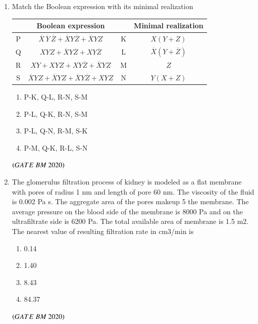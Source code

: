\documentclass[journal,12pt,onecolumn]{IEEEtran}
\theoremstyle{remark}
\begin{document}
\begin{enumerate}
\item Match the Boolean expression with its minimal realization\\
\begin{center}
\begin{tabular}{|c|c|c|c|}
\hline
\textbf{} & \textbf{Boolean expression} & \textbf{} & \textbf{Minimal realization} \\
\hline
P & $\overline{X}\,\overline{Y}\,\overline{Z} + \overline{X}Y\overline{Z} + \overline{X}YZ$ & K & $X(Y+Z)$ \\
\hline
Q & $XYZ + \overline{X}Y\overline{Z} + XY\overline{Z}$ & L & $\overline{X}(Y+\overline{Z})$ \\
\hline
R & $XY + XYZ + XY\overline{Z} + \overline{X}YZ$ & M & $Z$ \\
\hline
S & $\overline{X}YZ + \overline{X}YZ + \overline{X}Y\overline{Z} + XYZ$ & N & $Y(X+Z)$ \\
\hline
\end{tabular}
\end{center}
\begin{enumerate}[label=\alph*)] 
\item\hspace{0.5cm}P-K, Q-L, R-N, S-M
\item\hspace{0.5cm}P-L, Q-K, R-N, S-M
\item\hspace{0.5cm}P-L, Q-N, R-M, S-K
\item\hspace{0.5cm}P-M, Q-K, R-L, S-N

\end{enumerate} 
 \hfill $\brak{GATE\ BM\ 2020}$\\
 
\item The glomerulus filtration process of kidney is modeled as a flat membrane with
pores of radius 1 nm and length of pore 60 nm. The viscosity of the fluid is
0.002 Pa s. The aggregate area of the pores makeup 5%
the membrane. The average pressure on the blood side of the membrane is
8000 Pa and on the ultrafiltrate side is 6200 Pa. The total available area of
membrane is 1.5 m2. The nearest value of resulting filtration rate in cm3/min is 
\begin{enumerate}[label=\alph*)] 
\item\hspace{0.5cm}0.14
\item\hspace{0.5cm}1.40
\item\hspace{0.5cm}8.43
\item\hspace{0.5cm}84.37
\end{enumerate}
 \hfill $\brak{GATE\ BM\ 2020}$\\
 

\end{enumerate}
\end{document}
